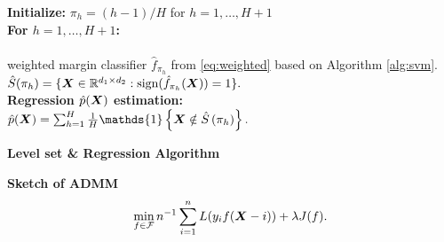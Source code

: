 \documentclass[12pt]{article}
\begin{document}
 \begin{algorithm}[h]
{\bf Initialize:} $\pi_h = (h-1)/H$ for $h = 1, \ldots, H+1$\\
{\bf For $h = 1,\ldots, H+1$:}\\
\hspace*{.5cm}{\bf Level set $\hat S(\pi_h)$ estimation:}\\
\hspace*{1cm}{\bf Train} weighted margin classifier $\hat f_{\pi_h}$ from \eqref{eq:weighted} based on Algorithm \ref{alg:svm}.
\\[.1cm]
\hspace*{.9cm} $\hat S(\pi_h) = \{\bm X\in\mathbb{R}^{d_1\times d_2}:\text{sign}(\hat f_{\pi_h}(\bm X)) = 1\}.$
\\[.1cm]
{\bf Regression $\hat p(\bm X)$ estimation:} \\[.1cm]
\hspace*{.4cm} $\hat p(\mX) = \sum_{h=1}^H\frac{1}{H}\mathds{1}\left\{\mX\notin\hat S\left(\pi_h\right)\right\}.$\\[.1cm]
    \caption{{\bf Level set \& Regression Algorithm} } \label{alg:regest}
\end{algorithm}

{\bf Sketch of ADMM}
\[
\min_{f\in \mathcal{F}}n^{-1}\sum_{i=1}^nL(y_if(\bm X-i))+\lambda J(f).
\]
\end{document}
